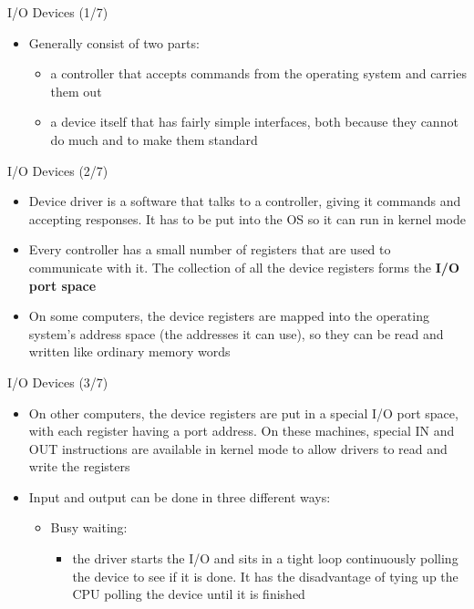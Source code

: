 \documentclass{beamer}
\begin{document}
\begin{frame}
{\centerline{I/O Devices (1/7)}}
\begin{itemize}
    \item Generally consist of two parts:
    \begin{itemize}
        \item a controller that accepts commands from the operating system and carries them out
        \item a device itself that has fairly simple interfaces, both because they cannot do much and to make them standard
    \end{itemize}
\end{itemize}
\end{frame}


\begin{frame}
{\centerline{I/O Devices (2/7)}}
\begin{itemize}
    \item Device driver is a software that talks to a controller, giving it commands and accepting responses. It has to be put into the OS so it can run in kernel mode 
    \item Every controller has a small number of registers that are used to communicate with it. The collection of all the device registers forms the \textbf{I/O port space}
    \item On some computers, the device registers are mapped into the operating system’s address space (the addresses it can use), so they can be read and written like ordinary memory words
\end{itemize}
\end{frame}


\begin{frame}
{\centerline{I/O Devices (3/7)}}
\begin{itemize}
    \item On other computers, the device registers are put in a special I/O port space, with each register having a port address. On these machines, special IN and OUT instructions are available in kernel mode to allow drivers to read and write the registers 
    \item Input and output can be done in three different ways:
    \begin{itemize}
        \item Busy waiting:
        \begin{itemize}
            \item the driver starts the I/O and sits in a tight loop continuously polling the device to see if it is done. It has the disadvantage of tying up the CPU polling the device until it is finished
        \end{itemize}
    \end{itemize}
\end{itemize}
\end{frame}
\end{document}
